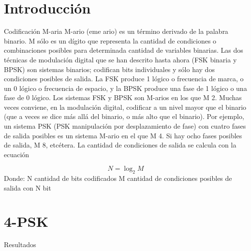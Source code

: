 \section{Introducción}

Codificación M-aria
M-ario (eme ario) es un término derivado de la palabra binario. M sólo es un dígito que representa la cantidad de condiciones o combinaciones posibles para determinada cantidad de variables
binarias. Las dos técnicas de modulación digital que se han descrito hasta ahora (FSK binaria y
BPSK) son sistemas binarios; codifican bits individuales y sólo hay dos condiciones posibles de
salida. La FSK produce 1 lógico o frecuencia de marca, o un 0 lógico o frecuencia de espacio,
y la BPSK produce una fase de 1 lógico o una fase de 0 lógico. Los sistemas FSK y BPSK son
M-arios en los que M  2.
Muchas veces conviene, en la modulación digital, codificar a un nivel mayor que el binario (que a veces se dice más allá del binario, o más alto que el binario). Por ejemplo, un sistema PSK (PSK  manipulación por desplazamiento de fase) con cuatro fases de salida posibles
es un sistema M-ario en el que M  4. Si hay ocho fases posibles de salida, M  8, etcétera. La
cantidad de condiciones de salida se calcula con la ecuación

\begin{equation}
	N=\log_2M
\end{equation}
Donde:
N  cantidad de bits codificados
M  cantidad de condiciones posibles de salida con N bit

\section{4-PSK}

Resultados

\begin{figure}
	\centering
	\incl
\end{figure}